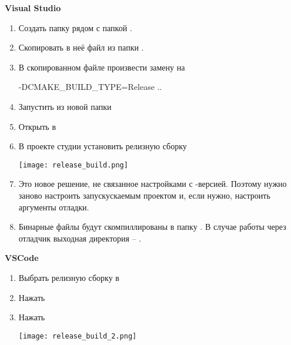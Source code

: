 {\bf Visual Studio}
\begin{enumerate}
\item Создать папку  рядом с папкой .
\item Скопировать в неё файл  из папки . 
\item В скопированном файле произвести замену  на 
\begin{shelloutput}
-DCMAKE_BUILD_TYPE=Release ..
\end{shelloutput}
\item Запустить  из новой папки
\item Открыть  в 
\item В проекте студии установить релизную сборку
\begin{center}
\texttt{[image: release\_build.png]}
\end{center}
\item Это новое решение, не связанное настройками с -версией.
      Поэтому нужно заново настроить запускускаемым проектом 
      и, если нужно, настроить аргументы отладки.
\item Бинарные файлы будут скомпиллированы в папку .
      В случае работы через отладчик выходная директория -- .
\end{enumerate}

{\bf VSCode}
\begin{enumerate}
\item Выбрать релизную сборку в 
\item Нажать 
\item Нажать 
\begin{center}
\texttt{[image: release\_build\_2.png]}
\end{center}
\end{enumerate}
